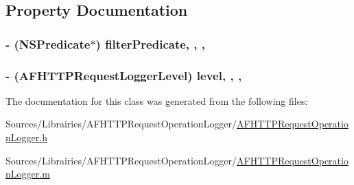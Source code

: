 \subsection{Property Documentation}
\hypertarget{interface_a_f_h_t_t_p_request_operation_logger_a3a02da0b24362a3411f4333ea9323618}{
\subsubsection[{filter\-Predicate}]{\setlength{\rightskip}{0pt plus 5cm}-\/ (N\-S\-Predicate$\ast$) filter\-Predicate\hspace{0.3cm}{\ttfamily [read]}, {\ttfamily [write]}, {\ttfamily [nonatomic]}, {\ttfamily [strong]}}}\label{interface_a_f_h_t_t_p_request_operation_logger_a3a02da0b24362a3411f4333ea9323618}
\hypertarget{interface_a_f_h_t_t_p_request_operation_logger_aadcb4568ad6dfad078e76cbe06c4b7d6}{
\subsubsection[{level}]{\setlength{\rightskip}{0pt plus 5cm}-\/ ({\bf A\-F\-H\-T\-T\-P\-Request\-Logger\-Level}) level\hspace{0.3cm}{\ttfamily [read]}, {\ttfamily [write]}, {\ttfamily [nonatomic]}, {\ttfamily [assign]}}}\label{interface_a_f_h_t_t_p_request_operation_logger_aadcb4568ad6dfad078e76cbe06c4b7d6}


The documentation for this class was generated from the following files\-:\begin{DoxyCompactItemize}
\item 
Sources/\-Librairies/\-A\-F\-H\-T\-T\-P\-Request\-Operation\-Logger/\hyperlink{_a_f_h_t_t_p_request_operation_logger_8h}{A\-F\-H\-T\-T\-P\-Request\-Operation\-Logger.\-h}\item 
Sources/\-Librairies/\-A\-F\-H\-T\-T\-P\-Request\-Operation\-Logger/\hyperlink{_a_f_h_t_t_p_request_operation_logger_8m}{A\-F\-H\-T\-T\-P\-Request\-Operation\-Logger.\-m}\end{DoxyCompactItemize}
